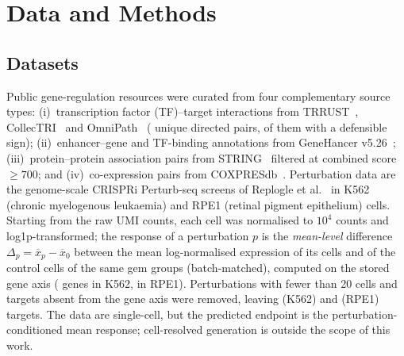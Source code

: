 \section{Data and Methods}
\label{sec:methods}

\subsection{Datasets}
\label{sec:data}
Public gene-regulation resources were curated from four complementary source types: (i)~transcription factor (TF)--target interactions from TRRUST~\cite{han2018trrust}, CollecTRI~\cite{mullerdott2023collectri} and OmniPath~\cite{turei2016omnipath} ( unique directed pairs,  of them with a defensible sign); (ii)~enhancer--gene and TF-binding annotations from GeneHancer v5.26~\cite{fishilevich2017genehancer}; (iii)~protein--protein association pairs from STRING~\cite{szklarczyk2023string} filtered at combined score $\ge 700$; and (iv)~co-expression pairs from COXPRESdb~\cite{obayashi2023coxpresdb}.
Perturbation data are the genome-scale CRISPRi Perturb-seq screens of Replogle et al.~\cite{replogle2022mapping} in K562 (chronic myelogenous leukaemia) and RPE1 (retinal pigment epithelium) cells. Starting from the raw UMI counts, each cell was normalised to $10^4$ counts and log1p-transformed; the response of a perturbation $p$ is the \emph{mean-level} difference $\Delta_p=\overline{x}_p-\overline{x}_{0}$ between the mean log-normalised expression of its cells and of the control cells of the same gem groups (batch-matched), computed on the stored gene axis ( genes in K562,  in RPE1).
Perturbations with fewer than 20 cells and targets absent from the gene axis were removed, leaving  (K562) and  (RPE1) targets. The data are single-cell, but the predicted endpoint is the perturbation-conditioned mean response; cell-resolved generation is outside the scope of this work.

